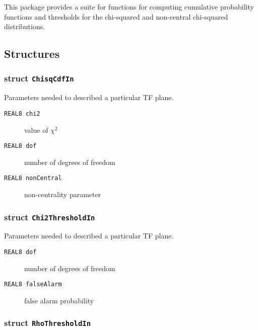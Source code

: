 \noindent This package provides a suite for functions for computing cumulative
probability functions and thresholds for the chi-squared and non-central
chi-squared distributions.

\subsection*{Structures}

\subsubsection*{struct \texttt{ChisqCdfIn}}

\noindent Parameters needed to described a particular TF plane.

\begin{description}
\item[\texttt{REAL8     chi2}] value of $\chi^2$
\item[\texttt{REAL8     dof}]  number of degrees of freedom
\item[\texttt{REAL8     nonCentral}]  non-centrality parameter
\end{description}

\subsubsection*{struct \texttt{Chi2ThresholdIn}}

\noindent Parameters needed to described a particular TF plane.

\begin{description}
\item[\texttt{REAL8     dof}]   number of degrees of freedom 
\item[\texttt{REAL8     falseAlarm}]  false alarm probability 
\end{description}

\subsubsection*{struct \texttt{RhoThresholdIn}}

